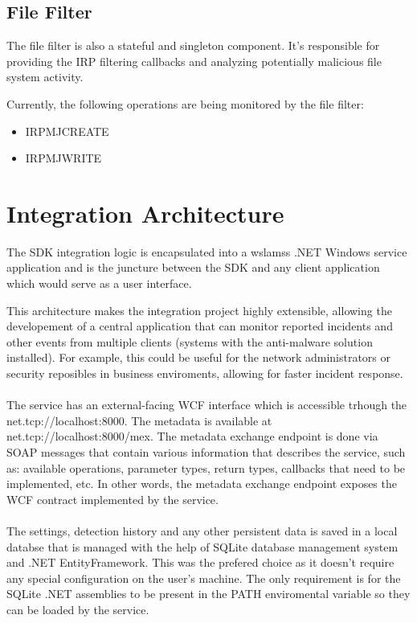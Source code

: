         \subsection{File Filter}
        The file filter is also a stateful and singleton component. It's responsible for providing the IRP filtering callbacks and analyzing
        potentially malicious file system activity.

        Currently, the following operations are being monitored by the file filter:

        \begin{itemize}
            \item IRP\textunderscore MJ\textunderscore CREATE
            \item IRP\textunderscore MJ\textunderscore WRITE
        \end{itemize}

    \section{Integration Architecture}
    The SDK integration logic is encapsulated into a wslamss .NET Windows service application and is the juncture between the SDK and any 
    client application which would serve as a user interface.

    This architecture makes the integration project highly extensible, allowing the developement of a central application that can monitor
    reported incidents and other events from multiple clients (systems with the anti-malware solution installed). For example, this could be
    useful for the network administrators or security reposibles in business enviroments, allowing for faster incident response.
    
    \paragraph{}
    The service has an external-facing WCF interface which is accessible trhough the net.tcp://localhost:8000. The metadata is available at
    net.tcp://localhost:8000/mex. The metadata exchange endpoint is done via SOAP messages that contain various information that describes
    the service, such as: available operations, parameter types, return types, callbacks that need to be implemented, etc. In other words,
    the metadata exchange endpoint exposes the WCF contract implemented by the service.

    \paragraph{}
    The settings, detection history and any other persistent data is saved in a local databse that is managed with the help of SQLite
    database management system and .NET EntityFramework. This was the prefered choice as it doesn't require any special configuration on
    the user's machine. The only requirement is for the SQLite .NET assemblies to be present in the PATH enviromental variable so they can
    be loaded by the service.

